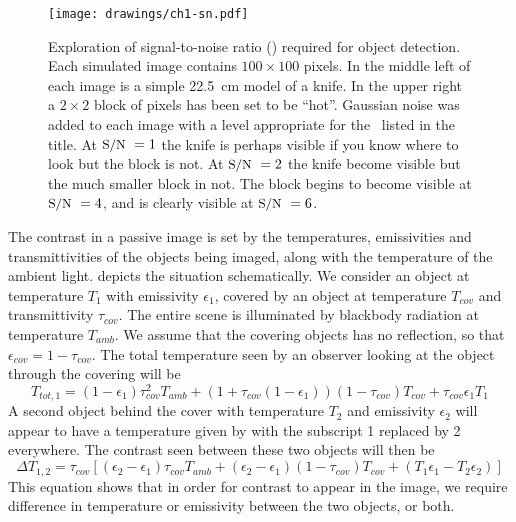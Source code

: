 \begin{figure}
\centering
\texttt{[image: drawings/ch1-sn.pdf]}
\caption[Signal-to-noise ratio for object detection]{
  Exploration of signal-to-noise ratio (\SN) required for object detection.
  Each simulated image contains $100 \times 100$ pixels.
  In the middle left of each image is a simple \SI{22.5}{\cm} model of a knife.
  In the upper right a $2\times2$ block of pixels has been set to be ``hot''.
  Gaussian noise was added to each image with a level appropriate for the \SN\ listed in the title.
  At $\text{\small{S/N}}\ = 1$ the knife is perhaps visible if you know where to look but the block is not.
  At $\text{\small{S/N}}\ = 2$ the knife become visible but the much smaller block in not.
  The block begins to become visible at $\text{\small{S/N}}\ = 4$, and is clearly visible at $\text{\small{S/N}}\ = 6$.
}
\label{fig:ch1-sn}
\end{figure}

The contrast in a passive image is set by the temperatures, emissivities and transmittivities of the objects being imaged, along with the temperature of the ambient light.
 depicts the situation schematically.
We consider an object at temperature $T_{1}$ with emissivity $\epsilon_1$, covered by an object at temperature $T_{cov}$ and transmittivity $\tau_{cov}$.
The entire scene is illuminated by blackbody radiation at temperature $T_{amb}$.
We assume that the covering objects has no reflection, so that $\epsilon_{cov} = 1 - \tau_{cov}$.
The total temperature seen by an observer looking at the object through the covering will be
\begin{equation} \label{eqn:ch1-t-tot}
  T_{tot,1} = (1 - \epsilon_{1}) \tau_{cov}^2 T_{amb} + 
           (1 + \tau_{cov}(1 - \epsilon_{1}))(1-\tau_{cov}) T_{cov} + 
           \tau_{cov} \epsilon_{1} T_1
\end{equation}
A second object behind the cover with temperature $T_2$ and emissivity $\epsilon_2$ will appear to have a temperature given by  with the subscript 1 replaced by 2 everywhere.
The contrast seen between these two objects will then be
\begin{equation} \label{eqn:ch1-delta-t}
  \Delta T_{1,2} = \tau_{cov} \left[ (\epsilon_2 - \epsilon_1) \tau_{cov} T_{amb} + 
                                    (\epsilon_2 - \epsilon_1) (1-\tau_{cov}) T_{cov} + 
                                    (T_1 \epsilon_1 - T_2 \epsilon_2) \right]
\end{equation}
This equation shows that in order for contrast to appear in the image, we require difference in temperature or emissivity between the two objects, or both.

